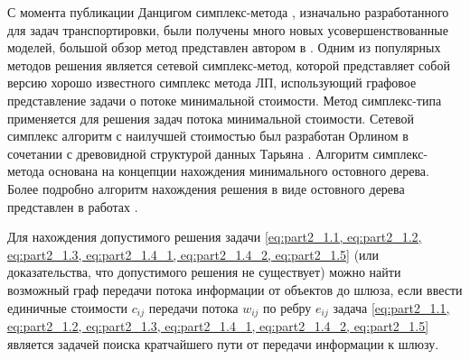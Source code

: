 



С момента публикации Данцигом симплекс-метода \cite{Dantzig1963}, изначально разработанного для задач транспортировки, были получены много новых усовершенствованные моделей, большой обзор метод представлен автором в \cite{Kovacs2015}. Одним из популярных методов решения является сетевой симплекс-метод, которой представляет собой версию хорошо известного симплекс метода ЛП, использующий графовое представление задачи о потоке минимальной стоимости. Метод симплекс-типа применяется для решения задач потока минимальной стоимости. Сетевой симплекс алгоритм с наилучшей стоимостью был разработан Орлином \cite{Orlin1997} в сочетании с древовидной структурой данных Тарьяна \cite{Tarjan1997}. Алгоритм симплекс-метода основана на концепции нахождения минимального остовного дерева. Более подробно алгоритм нахождения решения в виде остовного дерева представлен в работах \cite{Kiraly2012, Kovacs2015, Holzhauser2017, Jiang2020}.

Для нахождения допустимого решения задачи \cref{eq:part2_1.1, eq:part2_1.2, eq:part2_1.3, eq:part2_1.4_1, eq:part2_1.4_2,  eq:part2_1.5} (или доказательства, что допустимого решения не существует) можно найти возможный граф передачи потока информации от объектов до шлюза, если ввести единичные стоимости $c_{ij}$ передачи потока $w_{ij}$ по ребру $e_{ij}$ задача \cref{eq:part2_1.1, eq:part2_1.2, eq:part2_1.3, eq:part2_1.4_1, eq:part2_1.4_2,  eq:part2_1.5} является задачей поиска кратчайшего пути от передачи информации к шлюзу. 

